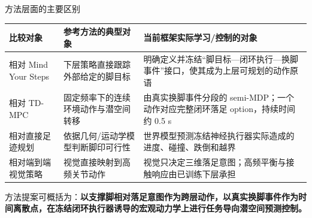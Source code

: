 \documentclass[aspectratio=169,10pt]{beamer}
\begin{document}
\begin{frame}{方法层面的主要区别}
\small
\begin{tabular}{p{}p{}p{}}
\toprule
比较对象 & 参考方法的典型对象 & 当前框架实际学习/控制的对象\\
\midrule
相对 Mind Your Steps & 下层策略直接跟踪外部给定的脚目标 & 明确定义并冻结“脚目标—闭环执行—换脚事件”接口，使其成为上层可规划的动作原语\\
相对 TD-MPC & 固定频率下的连续环境动作与潜空间转移 & 由真实换脚事件分段的 semi-MDP；一个动作对应完整闭环落足 option，持续时间约 0.5 s\\
相对直接足迹规划 & 依据几何/运动学模型判断脚印可行性 & 世界模型预测冻结神经执行器实际造成的进度、碰撞、跌倒和越界\\
相对端到端视觉策略 & 视觉直接映射到高频关节动作 & 视觉只决定三维落足意图；高频平衡与接触响应由已训练下层承担\\
\bottomrule
\end{tabular}
\vspace{0.5em}
方法提案可概括为：\textbf{以支撑脚相对落足意图作为跨层动作，以真实换脚事件作为时间离散点，在冻结闭环执行器诱导的宏观动力学上进行任务导向潜空间预测控制。}
\end{frame}
\end{document}

